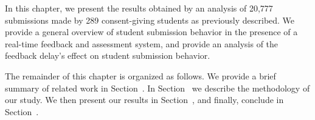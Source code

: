 In this chapter, we present the results obtained by an analysis of 20,777
submissions made by 289 consent-giving students as previously described. We
provide a general overview of student submission behavior in the presence of a
real-time feedback and assessment system, and provide an analysis of the
feedback delay's effect on student submission behavior.

The remainder of this chapter is organized as follows. We provide a brief
summary of related work in Section~. In
Section~ we describe the methodology of our study. We
then present our results in Section~, and finally,
conclude in Section~.
